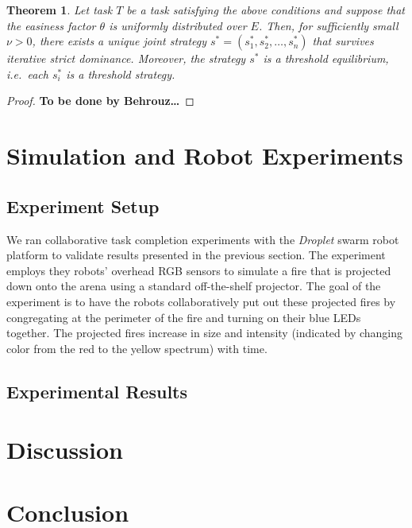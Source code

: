 \documentclass[conference]{ieeeconf}
\newtheorem{theorem}{Theorem}
\begin{document}
\begin{theorem}
Let task $T$ be a task satisfying the above conditions and suppose that the easiness factor $\theta$ is uniformly distributed over $E$. Then, for sufficiently small $\nu>0$, there exists a unique joint strategy $s^*=(s_1^*,s_2^*,\ldots,s_n^*)$ that survives iterative strict dominance. Moreover, the strategy $s^*$ is a threshold equilibrium, i.e.\ each $s_i^*$ is a threshold strategy.
\end{theorem}

\begin{proof}
\textbf{To be done by Behrouz\ldots}
\end{proof}




\section{Simulation and Robot Experiments}\label{sec:exp}
\subsection{Experiment Setup}\label{sec:expsetup}
We ran collaborative task completion experiments with the \emph{Droplet} swarm robot platform to validate results presented in the previous section. The experiment employs they robots' overhead RGB sensors to simulate a fire that is projected down onto the arena using a standard off-the-shelf projector. The goal of the experiment is to have the robots collaboratively put out these projected fires by congregating at the perimeter of the fire and turning on their blue LEDs together. The projected fires increase in size and intensity (indicated by changing color from the red to the yellow spectrum) with time.

\subsection{Experimental Results}\label{sec:expresults}




\section{Discussion}\label{sec:disc}




\section{Conclusion}\label{sec:conc}





\end{document}
